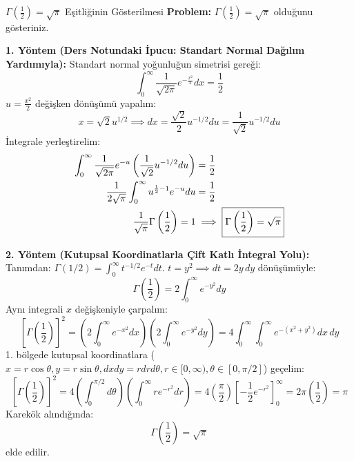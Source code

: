 \documentclass[12pt,a4paper]{article}
\begin{document}
\begin{odev}{$\Gamma\left(\frac{1}{2}\right) = \sqrt{\pi}$ Eşitliğinin Gösterilmesi}
\textbf{Problem:} $\Gamma\left(\frac{1}{2}\right) = \sqrt{\pi}$ olduğunu gösteriniz.

\bigskip
\textbf{1. Yöntem (Ders Notundaki İpucu: Standart Normal Dağılım Yardımıyla):}  
Standart normal yoğunluğun simetrisi gereği:
\begin{equation}
    \int_{0}^{\infty} \frac{1}{\sqrt{2\pi}} e^{-\frac{x^2}{2}} dx = \frac{1}{2}
\end{equation}
$u = \frac{x^2}{2}$ değişken dönüşümü yapalım:
\begin{equation}
    x = \sqrt{2} u^{1/2} \implies dx = \frac{\sqrt{2}}{2} u^{-1/2} du = \frac{1}{\sqrt{2}} u^{-1/2} du
\end{equation}
İntegrale yerleştirelim:
\begin{align}
    \int_{0}^{\infty} \frac{1}{\sqrt{2\pi}} e^{-u} \left( \frac{1}{\sqrt{2}} u^{-1/2} du \right) &= \frac{1}{2} \notag \\
    \frac{1}{2\sqrt{\pi}} \int_{0}^{\infty} u^{\frac{1}{2} - 1} e^{-u} du &= \frac{1}{2} \notag \\
    \frac{1}{\sqrt{\pi}} \Gamma\left(\frac{1}{2}\right) = 1 &\implies \boxed{\Gamma\left(\frac{1}{2}\right) = \sqrt{\pi}}
\end{align}

\bigskip
\textbf{2. Yöntem (Kutupsal Koordinatlarla Çift Katlı İntegral Yolu):}  
Tanımdan: $\Gamma(1/2) = \int_0^\infty t^{-1/2} e^{-t} dt$. $t = y^2 \implies dt = 2y \, dy$ dönüşümüyle:
\begin{equation}
    \Gamma\left(\frac{1}{2}\right) = 2 \int_0^\infty e^{-y^2} dy
\end{equation}
Aynı integrali $x$ değişkeniyle çarpalım:
\begin{equation}
    \left[ \Gamma\left(\frac{1}{2}\right) \right]^2 = \left( 2 \int_0^\infty e^{-x^2} dx \right) \left( 2 \int_0^\infty e^{-y^2} dy \right) = 4 \int_0^\infty \int_0^\infty e^{-(x^2 + y^2)} dx \, dy
\end{equation}
1. bölgede kutupsal koordinatlara ($x = r\cos\theta, y = r\sin\theta, dx dy = r dr d\theta, r \in [0, \infty), \theta \in [0, \pi/2]$) geçelim:
\begin{equation}
    \left[ \Gamma\left(\frac{1}{2}\right) \right]^2 = 4 \left( \int_0^{\pi/2} d\theta \right) \left( \int_0^\infty r e^{-r^2} dr \right) = 4 \left( \frac{\pi}{2} \right) \left[ -\frac{1}{2} e^{-r^2} \right]_0^\infty = 2\pi \left(\frac{1}{2}\right) = \pi
\end{equation}
Karekök alındığında:
\begin{equation}
    \boxed{\Gamma\left(\frac{1}{2}\right) = \sqrt{\pi}}
\end{equation}
elde edilir.
\end{odev}
\end{document}
